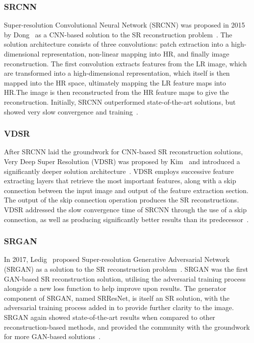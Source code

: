 \subsubsection{SRCNN}
Super-resolution Convolutional Neural Network (SRCNN) was proposed in 2015 by Dong \etal\ as a CNN-based solution to the SR reconstruction problem~\cite{srcnn}. The solution architecture consists of three convolutions: patch extraction into a high-dimensional representation, non-linear mapping into HR, and finally image reconstruction. The first convolution extracts features from the LR image, which are transformed into a high-dimensional representation, which itself is then mapped into the HR space, ultimately mapping the LR feature maps into HR.\@ The image is then reconstructed from the HR feature maps to give the reconstruction. Initially, SRCNN outperformed state-of-the-art solutions, but showed very slow convergence and training~\cite{srcnn, vdsr}.

\subsubsection{VDSR}
After SRCNN laid the groundwork for CNN-based SR reconstruction solutions, Very Deep Super Resolution (VDSR) was proposed by Kim \etal\ and introduced a significantly deeper solution architecture~\cite{vdsr}. VDSR employs successive feature extracting layers that retrieve the most important features, along with a skip connection between the input image and output of the feature extraction section. The output of the skip connection operation produces the SR reconstructions. VDSR addressed the slow convergence time of SRCNN through the use of a skip connection, as well as producing significantly better results than its predecessor~\cite{vdsr}.

\subsubsection{SRGAN}
In 2017, Ledig \etal\ proposed Super-resolution Generative Adversarial Network (SRGAN) as a solution to the SR reconstruction problem~\cite{srgan}. SRGAN was the first GAN-based SR reconstruction solution, utilising the adversarial training process alongside a new loss function to help improve upon results. The generator component of SRGAN, named SRResNet, is itself an SR solution, with the adversarial training process added in to provide further clarity to the image. SRGAN again showed state-of-the-art results when compared to other reconstruction-based methods, and provided the community with the groundwork for more GAN-based solutions~\cite{srgan}.

